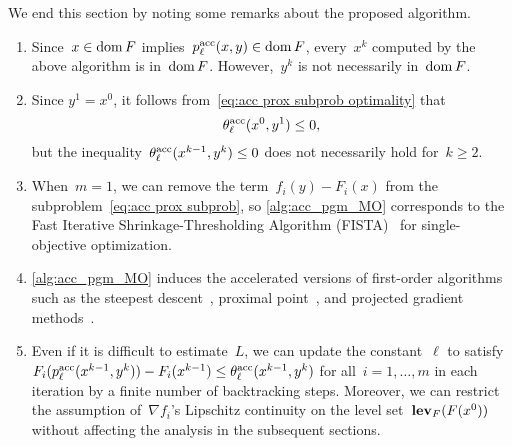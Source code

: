 \documentclass[../main]{subfiles}
\begin{document}
We end this section by noting some remarks about the proposed algorithm.
\begin{remark} \label{rem: acc-pgm}
    \begin{enumerate}
        \item Since~$x \in \operatorname{dom} F$ implies~$p^{\mathrm{acc}}_\ell(x, y) \in \operatorname{dom} F$, every~$x^k$ computed by the above algorithm is in~$\operatorname{dom} F$.
            However,~$y^k$ is not necessarily in~$\operatorname{dom} F$.
        \item Since $y^1 = x^0$, it follows from~\cref{eq:acc prox subprob optimality} that
            \[ \label{eq:subprob ineq}
                \theta^{\mathrm{acc}}_\ell(x^0, y^1) \le 0
            ,\]
            but the inequality~$\theta^{\mathrm{acc}}_\ell(x^{k - 1}, y^k) \le 0$ does not necessarily hold for~$k \ge 2$.
        \item When~$m = 1$, we can remove the term~$f_i(y) - F_i(x)$ from the subproblem~\cref{eq:acc prox subprob}, so \cref{alg:acc_pgm_MO} corresponds to the Fast Iterative Shrinkage-Thresholding Algorithm (FISTA)~\cite{Beck2009} for single-objective optimization.
        \item \cref{alg:acc_pgm_MO} induces the accelerated versions of first-order algorithms such as the steepest descent~\cite{Fliege2000}, proximal point~\cite{Bonnel2005}, and projected gradient methods~\cite{Grana-Drummond2004}.
        \item Even if it is difficult to estimate~$L$, we can update the constant~$\ell$ to satisfy~$F_i(p^{\mathrm{acc}}_\ell(x^{k - 1}, y^k)) - F_i(x^{k - 1}) \le \theta^{\mathrm{acc}}_\ell(x^{k - 1}, y^k)$ for all~$i = 1, \dots, m$ in each iteration by a finite number of backtracking steps.
            Moreover, we can restrict the assumption of~$\nabla f_i$'s Lipschitz continuity on the level set~$\operatorname{\mathbf{lev}}_F(F(x^0))$ without affecting the analysis in the subsequent sections.
    \end{enumerate}
\end{remark}
\end{document}
